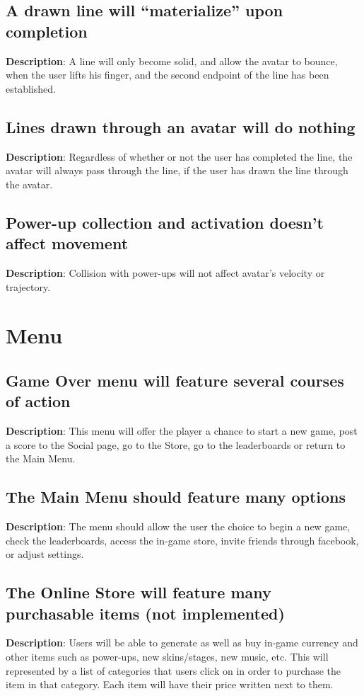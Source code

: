\subsection{A drawn line will \textquotedblleft{}materialize\textquotedblright{}
upon completion}
\textbf{Description}: A line will only become solid, and allow the
avatar to bounce, when the user lifts his finger, and the second endpoint
of the line has been established.

\subsection{Lines drawn through an avatar will do nothing}
\textbf{Description}: Regardless of whether or not the user has completed
the line, the avatar will always pass through the line, if the user
has drawn the line through the avatar.

\subsection{Power-up collection and activation doesn't affect movement}
\textbf{Description}: Collision with power-ups will not affect avatar's 
velocity or trajectory.


\section{Menu}
\renewcommand\thesubsection{MENU-%
\ifnum\value{subsection}<10 0\fi
\arabic{subsection}}
\subsection{Game Over menu will feature several courses of action}
\textbf{Description}: This menu will offer the player a chance to
start a new game, post a score to the Social page, go to the Store,
go to the leaderboards or return to the Main Menu.

\subsection{The Main Menu should feature many options}
\textbf{Description}: The menu should allow the user the choice to
begin a new game, check the leaderboards, access the in-game store,
invite friends through facebook, or adjust settings.

\subsection{The Online Store will feature many purchasable items (not implemented)}
\textbf{Description}: Users will be able to generate as well as buy
in-game currency and other items such as power-ups, new skins/stages,
new music, etc. This will represented by a list of categories that
users click on in order to purchase the item in that category. Each
item will have their price written next to them.

